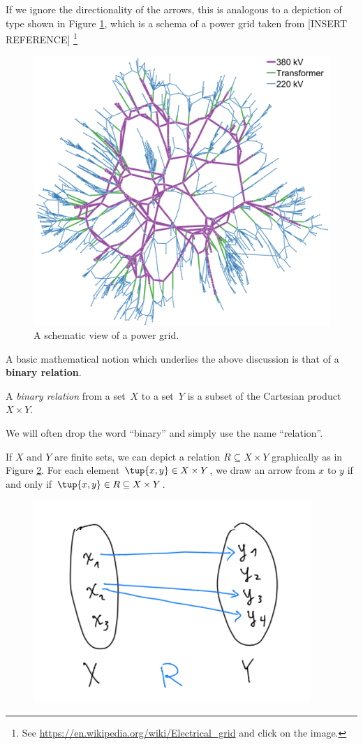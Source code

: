 If we ignore the directionality of the arrows, this is analogous to a depiction of type shown in Figure \ref{fig:power_schema}, which is a schema of a power grid taken from [INSERT REFERENCE] \footnote{See \url{https://en.wikipedia.org/wiki/Electrical_grid} and click on the image.} 

\begin{figure}[h!]
\centering
 \includegraphics[width=0.5\linewidth]{pics/power_dist_network.png}
 \caption{A schematic view of a power grid.}
\label{fig:power_schema}
\end{figure}


A basic mathematical notion which underlies the above discussion is that of a \textbf{binary relation}. 

\begin{definition}
A \emph{binary relation} from a set~$X$ to a set~$Y$ is a subset of the Cartesian product $X\times Y$. 
\end{definition}

\begin{remark}
We will often drop the word ``binary'' and simply use the name ``relation''.  
\end{remark}

If $X$ and $Y$ are finite sets, we can depict a relation $R \subseteq X \times Y$ graphically as in Figure \ref{fig:example_rel}. For each element $\tup{x,y} \in X \times Y$, we draw an arrow from $x$ to $y$ if and only if $\tup{x,y} \in R \subseteq X \times Y$. 

\begin{figure}[h!]
\centering
 \includegraphics[width=0.5\linewidth]{pics/dist_net_7.png}
 \caption{}
\label{fig:example_rel}
\end{figure}

